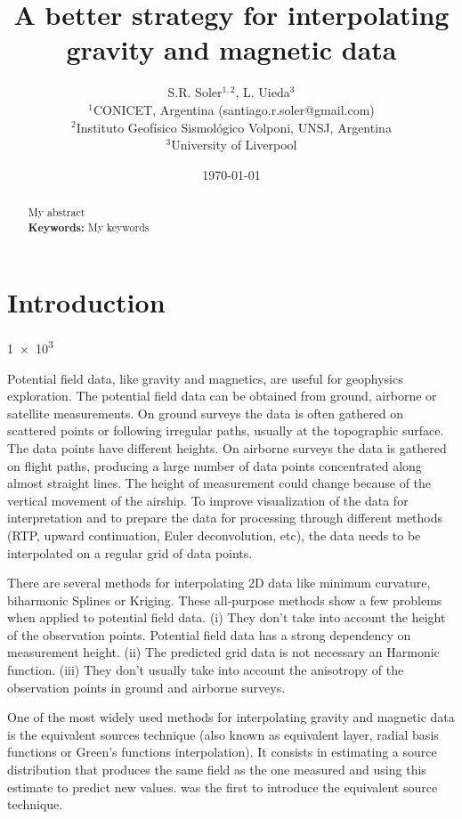 \documentclass[twocolumn]{article}
\makeatletter
\newcommand{\Title}{
    A better strategy for interpolating gravity and magnetic data
}
\newcommand{\AuthorAffil}{
    {\large
        S.R. Soler$^{1,2}$,
        L. Uieda$^{3}$
    }
    \\[0.4cm]
    {\small $^{1}$CONICET, Argentina (santiago.r.soler@gmail.com)} \\
    {\small $^{2}$Instituto Geofísico Sismológico Volponi, UNSJ, Argentina} \\
    {\small $^{3}$University of Liverpool} \\

}
\makeatother
\begin{document}
\title{\Title}
\author{\AuthorAffil}
\date{
    \normalsize
    \today
}
\maketitle

\begin{abstract}
    My abstract
    \\[0.5cm]
    \textbf{Keywords:}
    My keywords
\end{abstract}


\section{Introduction}

\num{1e3}

Potential field data, like gravity and magnetics, are useful for geophysics
exploration.
The potential field data can be obtained from ground, airborne or satellite
measurements.
On ground surveys the data is often gathered on scattered points or following
irregular paths, usually at the topographic surface.
The data points have different heights.
On airborne surveys the data is gathered on flight paths, producing a large
number of data points concentrated along almost straight lines.
The height of measurement could change because of the vertical movement of the
airship.
To improve visualization of the data for interpretation and to prepare the data
for processing through different methods (RTP, upward continuation, Euler
deconvolution, etc), the data needs to be interpolated on a regular grid of
data points.

There are several methods for interpolating 2D data like minimum curvature,
biharmonic Splines or Kriging.
These all-purpose methods show a few problems when applied to potential field
data.
(i) They don't take into account the height of the observation points.
Potential field data has a strong dependency on measurement height.
(ii) The predicted grid data is not necessary an Harmonic function.
(iii) They don't usually take into account the anisotropy of the observation
points in ground and airborne surveys.

One of the most widely used methods for interpolating gravity and magnetic data
is the equivalent sources technique (also known as equivalent layer, radial
basis functions or Green's functions interpolation).
It consists in estimating a source distribution that produces the same field as
the one measured and using this estimate to predict new values.
\citet{dampney1969} was the first to introduce the equivalent source technique.
\end{document}
